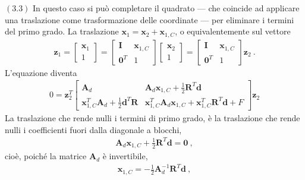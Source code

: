\documentclass[letterpaper,10pt,italian]{jupyterBook}
\begin{document}
\sphinxAtStartPar
\((3.3)\)  In questo caso si può completare il quadrato — che coincide ad applicare una traslazione come trasformazione delle coordinate — per eliminare i termini del primo grado. La traslazione \(\mathbf{x}_1 = \mathbf{x}_2 + \mathbf{x}_{1,C}\), o equivalentemente sul vettore
\begin{equation*}
\begin{split}\mathbf{z}_1 = \begin{bmatrix} \mathbf{x}_1 \\ 1 \end{bmatrix} = \begin{bmatrix} \mathbf{I} & \mathbf{x}_{1,C} \\ \mathbf{0}^T & 1 \end{bmatrix} \begin{bmatrix} \mathbf{x}_2 \\ 1 \end{bmatrix} = \begin{bmatrix} \mathbf{I} & \mathbf{x}_{1,C} \\ \mathbf{0}^T & 1 \end{bmatrix} \mathbf{z}_2  \ .\end{split}
\end{equation*}
\sphinxAtStartPar
L’equazione diventa
\begin{equation*}
\begin{split}
0 = \mathbf{z}_2^T \begin{bmatrix} \mathbf{A}_d & \mathbf{A}_d \mathbf{x}_{1,C} + \frac{1}{2} \mathbf{R}^T \mathbf{d} \\ \mathbf{x}_{1,C}^T \mathbf{A}_d + \frac{1}{2} \mathbf{d}^T \mathbf{R} & \mathbf{x}_{1,C}^T \mathbf{A}_d \mathbf{x}_{1,C} + \mathbf{x}^T_{1,C} \mathbf{R}^T \mathbf{d} + F \end{bmatrix} \mathbf{z}_2
\end{split}
\end{equation*}
\sphinxAtStartPar
La traslazione che rende nulli i termini di primo grado, è la traslazione che rende nulli i coefficienti fuori dalla diagonale a blocchi,
\begin{equation*}
\begin{split}\mathbf{A}_d \mathbf{x}_{1,C} + \frac{1}{2} \mathbf{R}^T \mathbf{d} = \mathbf{0} \ ,\end{split}
\end{equation*}
\sphinxAtStartPar
cioè, poiché la matrice \(\mathbf{A}_d\) è invertibile,
\begin{equation*}
\begin{split}\mathbf{x}_{1,C} = - \frac{1}{2} \mathbf{A}_d^{-1} \mathbf{R}^T \mathbf{d} \ ,\end{split}
\end{equation*}
\end{document}
